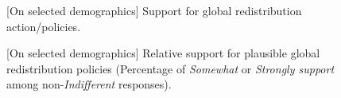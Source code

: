 \begin{figure}[h!]
    \caption[{[}On selected demographics{]} Absolute support for broad or radical global redistribution]{[On selected demographics] Support for global redistribution action/policies. %
    }\label{fig:main_radical_redistr_pol} 
\end{figure}

\begin{figure}[h!]
    \caption[{[}On selected demographics{]} Relative support for plausible global policies]{[On selected demographics] Relative support for plausible global redistribution policies (Percentage of \textit{Somewhat} or \textit{Strongly support} among non-\textit{Indifferent} responses). %
    }\label{fig:solidarity_support_pol_share}
\end{figure}

